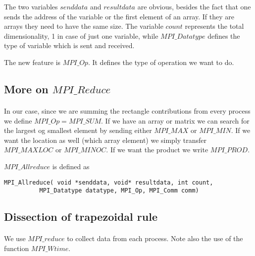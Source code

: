 \documentclass[%
oneside,                 %
final,                   %
10pt]{article}
\begin{document}
The two variables $senddata$ and $resultdata$ are obvious, besides the fact that one sends the address
of the variable or the first element of an array.  If they are arrays they need to have the same size. 
The variable $count$ represents the total dimensionality, 1 in case of just one variable, 
while $MPI\_Datatype$ 
defines the type of variable which is sent and received.  

The new feature is $MPI\_Op$. It defines the type
of operation we want to do.



\subsection*{More on $MPI\_Reduce$}

\paragraph{}
In our case, since we are summing
the rectangle  contributions from every process we define  $MPI\_Op = MPI\_SUM$.
If we have an array or matrix we can search for the largest og smallest element by sending either $MPI\_MAX$ or 
$MPI\_MIN$.  If we want the location as well (which array element) we simply transfer 
$MPI\_MAXLOC$ or $MPI\_MINOC$. If we want the product we write $MPI\_PROD$. 

$MPI\_Allreduce$ is defined as



\begin{verbatim}
MPI_Allreduce( void *senddata, void* resultdata, int count, 
          MPI_Datatype datatype, MPI_Op, MPI_Comm comm)        

\end{verbatim}



\subsection*{Dissection of trapezoidal rule}

\paragraph{}

We use $MPI\_reduce$ to collect data from each process. Note also the use of the function 
$MPI\_Wtime$. 
\end{document}
